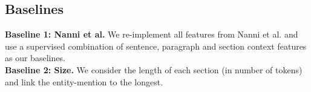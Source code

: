 \documentclass[sigconf,authordraft]{acmart}
\begin{document}



\subsection{Baselines}
\label{subsec:Baselines}

\textbf{Baseline 1: Nanni et al.} We re-implement all features from Nanni et al. \cite{nanni2018entity} and use a supervised combination of sentence, paragraph and section context features as our baselines. \\
\textbf{Baseline 2: Size.} We consider the length of each section (in number of tokens) and link the entity-mention to the longest. \\
\end{document}
